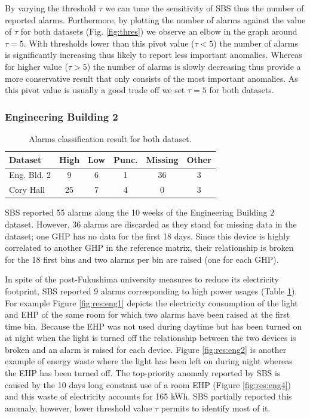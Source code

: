 By varying the threshold $\tau$ we can tune the sensitivity of SBS thus the number of reported alarms.  
Furthermore, by plotting the number of alarms against the value of $\tau$ for both datasets (Fig. \ref{fig:thres}) we observe an elbow in the graph around $\tau=5$.
With thresholds lower than this pivot value ($\tau<5$) the number of alarms is significantly increasing thus likely to report less important anomalies.
Whereas for higher value ($\tau>5$) the number of alarms is slowly decreasing thus provide a more conservative result that only consists of the most important anomalies.
As this pivot value is usually a good trade off we set $\tau=5$ for both datasets.


\subsubsection{Engineering Building 2}

\begin{table}
\begin{center}
\begin{tabular}{|l||c|c|c|c|c|}
\hline
Dataset&High&Low&Punc.&Missing&Other\\ \hline \hline
Eng. Bld. 2& 9 & 6 & 1 & 36 & 3 \\ \hline
Cory Hall& 25 & 7 & 4 & 0 & 3 \\ \hline
\end{tabular}
\end{center}
\caption{Alarms classification result for both dataset.}
\label{tab:classif}
\end{table}

SBS reported 55 alarms along the 10 weeks of the Engineering Building 2 dataset.
However, 36 alarms are discarded as they stand for missing data in the dataset; one GHP has no data for the first 18 days.
Since this device is highly correlated to another GHP in the reference matrix, their relationship is broken for the 18 first bins and two alarms per bin are raised (one for each GHP).

In spite of the post-Fukushima university measures to reduce its electricity footprint, SBS reported 9 alarms corresponding to high power usages (Table \ref{tab:classif}).
For example Figure \ref{fig:res:eng1} depicts the electricity consumption of the light and EHP of the same room for which two alarms have been raised at the first time bin.
Because the EHP was not used during daytime but has been turned on at night when the light is turned off the relationship between the two devices is broken and an alarm is raised for each device.
Figure \ref{fig:res:eng2} is another example of energy waste where the light has been left on during night whereas the EHP has been turned off.
The top-priority anomaly reported by SBS is caused by the 10 days long constant use of a room EHP (Figure \ref{fig:res:eng4}) and this waste of electricity accounts for 165 kWh.
SBS partially reported this anomaly, however, lower threshold value $\tau$ permits to identify most of it.

